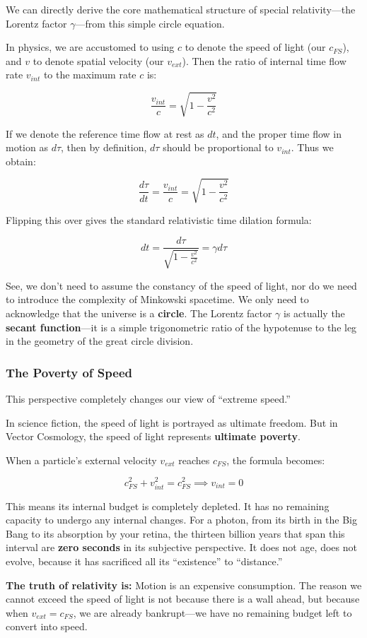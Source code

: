 We can directly derive the core mathematical structure of special relativity---the Lorentz factor $\gamma$---from this simple circle equation.

In physics, we are accustomed to using $c$ to denote the speed of light (our $c_{FS}$), and $v$ to denote spatial velocity (our $v_{ext}$). Then the ratio of internal time flow rate $v_{int}$ to the maximum rate $c$ is:

\[\frac{v_{int}}{c} = \sqrt{1 - \frac{v^2}{c^2}}\]

If we denote the reference time flow at rest as $dt$, and the proper time flow in motion as $d\tau$, then by definition, $d\tau$ should be proportional to $v_{int}$. Thus we obtain:

\[\frac{d\tau}{dt} = \frac{v_{int}}{c} = \sqrt{1 - \frac{v^2}{c^2}}\]

Flipping this over gives the standard relativistic time dilation formula:

\[dt = \frac{d\tau}{\sqrt{1 - \frac{v^2}{c^2}}} = \gamma d\tau\]

See, we don't need to assume the constancy of the speed of light, nor do we need to introduce the complexity of Minkowski spacetime. We only need to acknowledge that the universe is a \textbf{circle}. The Lorentz factor $\gamma$ is actually the \textbf{secant function}---it is a simple trigonometric ratio of the hypotenuse to the leg in the geometry of the great circle division.

\subsubsection{The Poverty of Speed}

This perspective completely changes our view of ``extreme speed.''

In science fiction, the speed of light is portrayed as ultimate freedom. But in Vector Cosmology, the speed of light represents \textbf{ultimate poverty}.

When a particle's external velocity $v_{ext}$ reaches $c_{FS}$, the formula becomes:

\[c_{FS}^2 + v_{int}^2 = c_{FS}^2 \implies v_{int} = 0\]

This means its internal budget is completely depleted. It has no remaining capacity to undergo any internal changes. For a photon, from its birth in the Big Bang to its absorption by your retina, the thirteen billion years that span this interval are \textbf{zero seconds} in its subjective perspective. It does not age, does not evolve, because it has sacrificed all its ``existence'' to ``distance.''

\textbf{The truth of relativity is:} Motion is an expensive consumption. The reason we cannot exceed the speed of light is not because there is a wall ahead, but because when $v_{ext} = c_{FS}$, we are already bankrupt---we have no remaining budget left to convert into speed.

